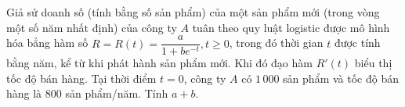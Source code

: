 \begin{ex}%
	Giả sử doanh số (tính bằng số sản phẩm) của một sản phẩm mới (trong vòng một số năm nhất định) của công ty $A$ tuân theo quy luật logistic được mô hình hóa bẳng hàm số $R=R(t)=\dfrac{a}{1+b e^{-t}}, t \geq 0$, trong đó thời gian $t$ được tính bằng năm, kể từ khi phát hành sản phẩm mới. Khi đó đạo hàm $R'(t)$ biểu thị tốc độ bán hàng. Tại thời điểm $t=0$, công ty $A$ có $1\,000$ sản phẩm và tốc độ bán hàng là $800$ sản phẩm/năm. Tính $a+b$.
\end{ex}

